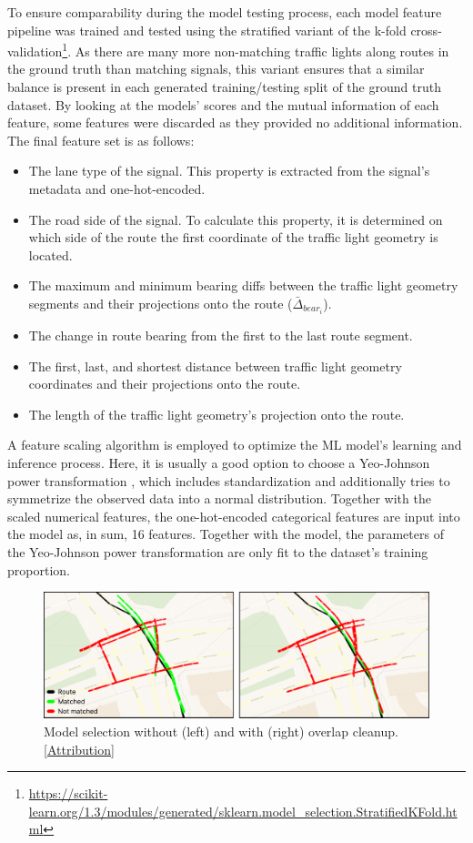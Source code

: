 To ensure comparability during the model testing process, each model feature pipeline was trained and tested using the stratified variant of the k-fold cross-validation\footnote{\url{https://scikit-learn.org/1.3/modules/generated/sklearn.model_selection.StratifiedKFold.html}}. As there are many more non-matching traffic lights along routes in the ground truth than matching signals, this variant ensures that a similar balance is present in each generated training/testing split of the ground truth dataset. By looking at the models' scores and the mutual information of each feature, some features were discarded as they provided no additional information. The final feature set is as follows:

\begin{itemize}
    \item The lane type of the signal. This property is extracted from the signal's metadata and one-hot-encoded.
    \item The road side of the signal. To calculate this property, it is determined on which side of the route the first coordinate of the traffic light geometry is located.
    \item The maximum and minimum bearing diffs between the traffic light geometry segments and their projections onto the route ($\bar{\Delta}_{bear_i}$).
    \item The change in route bearing from the first to the last route segment. 
    \item The first, last, and shortest distance between traffic light geometry coordinates and their projections onto the route.
    \item The length of the traffic light geometry's projection onto the route.
\end{itemize}

A feature scaling algorithm is employed to optimize the ML model's learning and inference process. Here, it is usually a good option to choose a Yeo-Johnson power transformation \cite{yeo_new_2000}, which includes standardization and additionally tries to symmetrize the observed data into a normal distribution. Together with the scaled numerical features, the one-hot-encoded categorical features are input into the model as, in sum, 16 features. Together with the model, the parameters of the Yeo-Johnson power transformation are only fit to the dataset's training proportion.

\begin{figure}[b]
\centering
\includegraphics[width=\linewidth]{images/sg-selection-overlap-cleanup.pdf}
\caption{Model selection without (left) and with (right) overlap cleanup. [\hyperref[attribution]{Attribution}]}
\label{fig:sg-selection-overlap-cleanup}
\end{figure}

